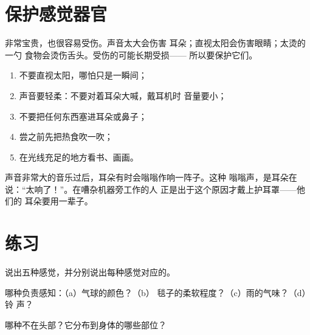 \section{保护感觉器官}

\begin{proposition}[脆弱的门]\label{prop:g1:the-five-senses:fragile}
非常宝贵，也很容易受伤。声音太大会伤害
耳朵；直视太阳会伤害眼睛；太烫的一勺
食物会烫伤舌头。受伤的可能长期受损——
所以要保护它们。
\end{proposition}
\admitted

\begin{method}[保护我的感觉器官]\label{met:g1:the-five-senses:protect}
\begin{enumerate}
  \item 不要直视太阳，哪怕只是一瞬间；
  \item 声音要轻柔：不要对着耳朵大喊，戴耳机时
        音量要小；
  \item 不要把任何东西塞进耳朵或鼻子；
  \item 尝之前先把热食吹一吹；
  \item 在光线充足的地方看书、画画。
\end{enumerate}
\end{method}

\begin{example}[隔壁的音乐会]\label{ex:g1:the-five-senses:loud}
声音非常大的音乐过后，耳朵有时会嗡嗡作响一阵子。这种
嗡嗡声，是耳朵在说：“太响了！”。在嘈杂机器旁工作的人
正是出于这个原因才戴上护耳罩——他们的
耳朵要用一辈子。
\end{example}

\section{练习}

\begin{exercise}[$\star$]\label{exo:g1:the-five-senses:1}
说出五种感觉，并分别说出每种感觉对应的。
\end{exercise}

\begin{exercise}[$\star$]\label{exo:g1:the-five-senses:2}
哪种负责感知：（a）气球的颜色？（b）
毯子的柔软程度？（c）雨的气味？（d）铃
声？
\end{exercise}

\begin{exercise}[$\star$]\label{exo:g1:the-five-senses:3}
哪种不在头部？它分布到身体的哪些部位？
\end{exercise}

